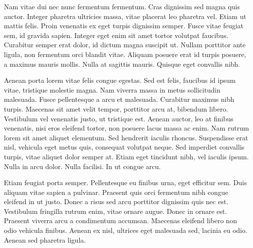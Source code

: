 \documentclass[9pt,twocolumn,twoside]{../../styles/osajnl}
\begin{document}
Nam vitae dui nec nunc fermentum fermentum. Cras dignissim sed magna
quis auctor. Integer pharetra ultricies massa, vitae placerat leo
pharetra vel. Etiam ut mattis felis. Proin venenatis ex eget turpis
dignissim semper. Fusce vitae feugiat sem, id gravida sapien. Integer
eget enim sit amet tortor volutpat faucibus. Curabitur semper erat
dolor, id dictum magna suscipit ut. Nullam porttitor ante ligula, non
fermentum orci blandit vitae. Aliquam posuere erat id turpis posuere,
a maximus mauris mollis. Nulla at sagittis mauris. Quisque eget
convallis nibh.

Aenean porta lorem vitae felis congue egestas. Sed est felis, faucibus
id ipsum vitae, tristique molestie magna. Nam viverra massa in metus
sollicitudin malesuada. Fusce pellentesque a arcu et
malesuada. Curabitur maximus nibh turpis. Maecenas sit amet velit
tempor, porttitor arcu at, bibendum libero. Vestibulum vel venenatis
justo, ut tristique est. Aenean auctor, leo at finibus venenatis, nisi
eros eleifend tortor, non posuere lacus massa ac enim. Nam rutrum
lorem sit amet aliquet elementum. Sed hendrerit iaculis
rhoncus. Suspendisse erat nisl, vehicula eget metus quis, consequat
volutpat neque. Sed imperdiet convallis turpis, vitae aliquet dolor
semper at. Etiam eget tincidunt nibh, vel iaculis ipsum. Nulla in arcu
dolor. Nulla facilisi. In ut congue arcu.

Etiam feugiat porta semper. Pellentesque eu finibus urna, eget
efficitur sem. Duis aliquam vitae sapien a pulvinar. Praesent quis
orci fermentum nibh congue eleifend in ut justo. Donec a risus sed
arcu porttitor dignissim quis nec est. Vestibulum fringilla rutrum
enim, vitae ornare augue. Donec in ornare est. Praesent viverra arcu a
condimentum accumsan. Maecenas eleifend libero non odio vehicula
finibus. Aenean ex nisl, ultrices eget malesuada sed, lacinia eu
odio. Aenean sed pharetra ligula.


\end{document}
